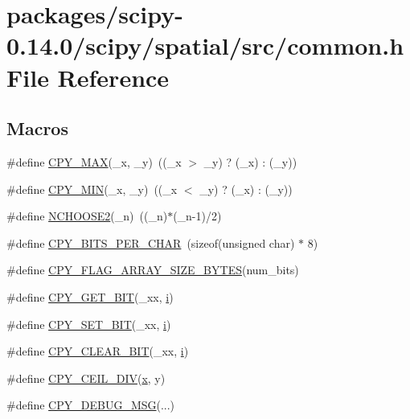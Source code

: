 \hypertarget{scipy-0_814_80_2scipy_2spatial_2src_2common_8h}{}\section{packages/scipy-\/0.14.0/scipy/spatial/src/common.h File Reference}
\label{scipy-0_814_80_2scipy_2spatial_2src_2common_8h}
\subsection*{Macros}
\begin{DoxyCompactItemize}
\item 
\#define \hyperlink{scipy-0_814_80_2scipy_2spatial_2src_2common_8h_a9711354dd174700495172b2704e15264}{C\+P\+Y\+\_\+\+M\+A\+X}(\+\_\+x,  \+\_\+y)~((\+\_\+x $>$ \+\_\+y) ? (\+\_\+x) \+: (\+\_\+y))
\item 
\#define \hyperlink{scipy-0_814_80_2scipy_2spatial_2src_2common_8h_a854cb1cc38fe7c993ba776d0abf73c0a}{C\+P\+Y\+\_\+\+M\+I\+N}(\+\_\+x,  \+\_\+y)~((\+\_\+x $<$ \+\_\+y) ? (\+\_\+x) \+: (\+\_\+y))
\item 
\#define \hyperlink{scipy-0_814_80_2scipy_2spatial_2src_2common_8h_abb718fbcba05766b98797bc0c8679392}{N\+C\+H\+O\+O\+S\+E2}(\+\_\+n)~((\+\_\+n)$\ast$(\+\_\+n-\/1)/2)
\item 
\#define \hyperlink{scipy-0_814_80_2scipy_2spatial_2src_2common_8h_a8e59f30d1b6f8530e3583cb8ceea23e6}{C\+P\+Y\+\_\+\+B\+I\+T\+S\+\_\+\+P\+E\+R\+\_\+\+C\+H\+A\+R}~(sizeof(unsigned char) $\ast$ 8)
\item 
\#define \hyperlink{scipy-0_814_80_2scipy_2spatial_2src_2common_8h_a79af9b0841bc1859896cfb0d7decc7ab}{C\+P\+Y\+\_\+\+F\+L\+A\+G\+\_\+\+A\+R\+R\+A\+Y\+\_\+\+S\+I\+Z\+E\+\_\+\+B\+Y\+T\+E\+S}(num\+\_\+bits)
\item 
\#define \hyperlink{scipy-0_814_80_2scipy_2spatial_2src_2common_8h_abbd3845f780999643f7befd2710dfa95}{C\+P\+Y\+\_\+\+G\+E\+T\+\_\+\+B\+I\+T}(\+\_\+xx,  \hyperlink{indexexpr_8h_aabd77643995707c185e95c8cb2782c81}{i})
\item 
\#define \hyperlink{scipy-0_814_80_2scipy_2spatial_2src_2common_8h_a8276cf81605493e8880428a02b7f1801}{C\+P\+Y\+\_\+\+S\+E\+T\+\_\+\+B\+I\+T}(\+\_\+xx,  \hyperlink{indexexpr_8h_aabd77643995707c185e95c8cb2782c81}{i})
\item 
\#define \hyperlink{scipy-0_814_80_2scipy_2spatial_2src_2common_8h_ab110690450f26f45b9a1592583710081}{C\+P\+Y\+\_\+\+C\+L\+E\+A\+R\+\_\+\+B\+I\+T}(\+\_\+xx,  \hyperlink{indexexpr_8h_aabd77643995707c185e95c8cb2782c81}{i})
\item 
\#define \hyperlink{scipy-0_814_80_2scipy_2spatial_2src_2common_8h_a5bc06e1af1a2b4e87d1fbab392a53caf}{C\+P\+Y\+\_\+\+C\+E\+I\+L\+\_\+\+D\+I\+V}(\hyperlink{vecnorm1_8cc_ac73eed9e41ec09d58f112f06c2d6cb63}{x},  y)
\item 
\#define \hyperlink{scipy-0_814_80_2scipy_2spatial_2src_2common_8h_adab9f9bba3002510208e9330da07c66c}{C\+P\+Y\+\_\+\+D\+E\+B\+U\+G\+\_\+\+M\+S\+G}(...)
\end{DoxyCompactItemize}


